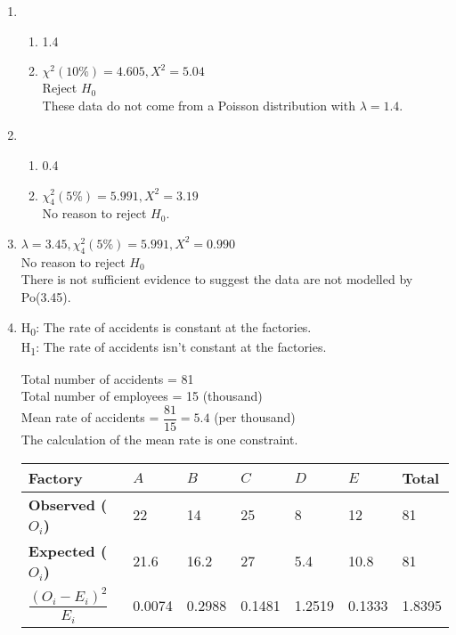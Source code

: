 \documentclass[fleqn]{article}
\begin{document}
\newpage
{}
\begin{enumerate}
    \setlength\itemsep{0.5em}
    \item \begin{enumerate}[label=\bfseries \alph*\space ]
        \item 1.4
        \item $\chi^2(10\%)=4.605, X^2=5.04$ \\
            Reject $H_0$ \\
            These data do not come from a Poisson distribution with $\lambda=1.4$.
        \end{enumerate}
    
    \item \begin{enumerate}[label=\bfseries \alph*\space ]
        \item 0.4
        \item $\chi_4^2(5\%)=5.991, X^2=3.19$ \\
            No reason to reject $H_0$.
        \end{enumerate}
    
    \item $\lambda=3.45, \chi_4^2(5\%)=5.991, X^2=0.990$ \\
        No reason to reject $H_0$ \\
        There is not sufficient evidence to suggest the data are not modelled by Po(3.45).
    
    \item H\textsubscript{0}: The rate of accidents is constant at the factories. \\
        H\textsubscript{1}: The rate of accidents isn't constant at the factories. 
        
        Total number of accidents = 81 \\
        Total number of employees = 15 (thousand) \\
        Mean rate of accidents = $\dfrac{81}{15}=5.4$ (per thousand) \\
        The calculation of the mean rate is one constraint.

        \begin{tabularx}{0.65\textwidth}{|X|*6{P{12mm}|}}
            \hline
            \textbf{Factory}           & $A$     & $B$    & $C$   & $D$  & $E$   & \textbf{Total}   \\\hline
            \textbf{Observed ($O_i$)}  & 22      & 14     & 25    & 8    & 12    & 81       \\\hline
            \textbf{Expected ($O_i$)}  & 21.6    & 16.2   & 27    & 5.4  & 10.8  & 81       \\\hline
            \vspace{-2mm}\textbf{\vspace{1.5mm}$\dfrac{(O_i-E_i)^2}{E_i}$}  & 0.0074 & 0.2988 & 0.1481 & 1.2519 & 0.1333 & 1.8395       \\\hline
        \end{tabularx}\vspace{4mm}


\end{enumerate}
\end{document}
